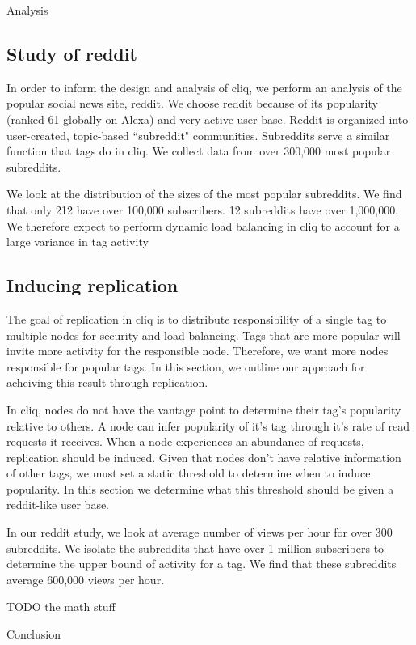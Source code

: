 \documentclass{sig-alternate}
\begin{document}
\begin{section}{Analysis}

\subsection{Study of reddit}
\label{subsec:redditstudy}

In order to inform the design and analysis of cliq, we perform an analysis of the popular social news site, reddit. We choose reddit because of its popularity (ranked 61 globally on Alexa) and very active user base. Reddit is organized into user-created, topic-based ``subreddit" communities. Subreddits serve a similar function that tags do in cliq. We collect data from over 300,000 most popular subreddits.

We look at the distribution of the sizes of the most popular subreddits. We find that only 212 have over 100,000 subscribers. 12 subreddits have over 1,000,000. We therefore expect to perform dynamic load balancing in cliq 
to account for a large variance in tag activity

\subsection{Inducing replication}
\label{subsec:inducereplication} 
The goal of replication in cliq is to distribute responsibility of a single tag to multiple nodes for security and load balancing. Tags that are more popular will invite more activity for the responsible node. Therefore, we want more nodes responsible for popular tags. In this section, we outline our approach for acheiving this result through replication.

In cliq, nodes do not have the vantage point to determine their tag's popularity relative to others. A node can infer popularity of it's tag through it's rate of read requests it receives. When a node experiences an abundance of requests, replication should be induced. Given that nodes don't have relative information of other tags, we must set a static threshold to determine when to induce popularity. In this section we determine what this threshold should be given a reddit-like user base. 

In our reddit study, we look at average number of views per hour for over 300 subreddits. We isolate the subreddits that have over 1 million subscribers to determine the upper bound of activity for a tag. We find that these subreddits average 600,000 views per hour. 

TODO the math stuff


\end{section}

\begin{section}{Conclusion}
  
\end{section}



\end{document}
